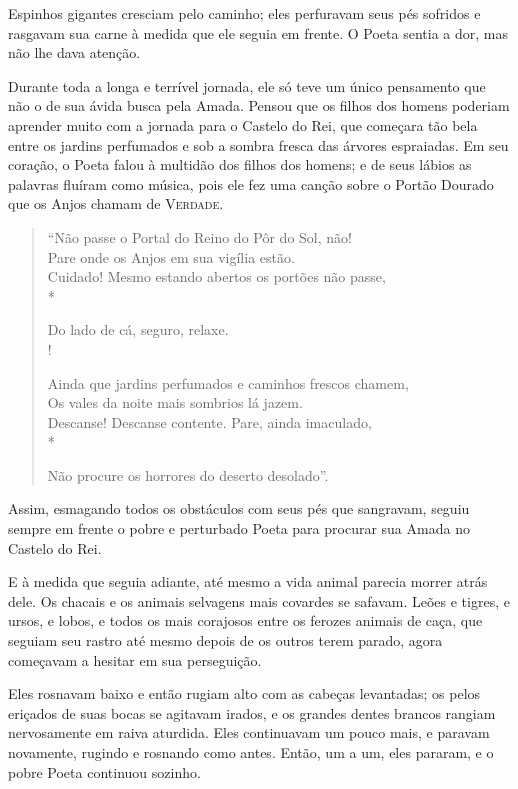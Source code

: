 Espinhos gigantes cresciam pelo caminho; eles perfuravam seus pés
sofridos e rasgavam sua carne à medida que ele seguia em frente. O Poeta
sentia a dor, mas não lhe dava atenção.

Durante toda a longa e terrível jornada, ele só teve um único pensamento
que não o de sua ávida busca pela Amada. Pensou que os filhos dos
homens poderiam aprender muito com a jornada para o Castelo do Rei, que
começara tão bela entre os jardins perfumados e sob a sombra fresca das
árvores espraiadas. Em seu coração, o Poeta falou à multidão dos filhos
dos homens; e de seus lábios as palavras fluíram como música, pois ele
fez uma canção sobre o Portão Dourado que os Anjos chamam de
\textsc{Verdade}.

\begin{verse}
``Não passe o Portal do Reino do Pôr do Sol, não!\\

Pare onde os Anjos em sua vigília estão.\\

Cuidado! Mesmo estando abertos os portões não passe,\\*

Do lado de cá, seguro, relaxe.\\!

Ainda que jardins perfumados e caminhos frescos chamem,\\

Os vales da noite mais sombrios lá jazem.\\

Descanse! Descanse contente. Pare, ainda imaculado,\\*

Não procure os horrores do deserto desolado''.\\
\end{verse}

Assim, esmagando todos os obstáculos com seus pés que sangravam, seguiu
sempre em frente o pobre e perturbado Poeta para procurar sua Amada no
Castelo do Rei.

E à medida que seguia adiante, até mesmo a vida animal parecia morrer
atrás dele. Os chacais e os animais selvagens mais covardes se safavam.
Leões e tigres, e ursos, e lobos, e todos os mais corajosos entre os
ferozes animais de caça, que seguiam seu rastro até mesmo depois de os
outros terem parado, agora começavam a hesitar em sua perseguição.

Eles rosnavam baixo e então rugiam alto com as cabeças levantadas; os
pelos eriçados de suas bocas se agitavam irados, e os grandes dentes
brancos rangiam nervosamente em raiva aturdida. Eles continuavam
um pouco mais, e paravam novamente, rugindo e rosnando como antes.
Então, um a um, eles pararam, e o pobre Poeta continuou sozinho.

